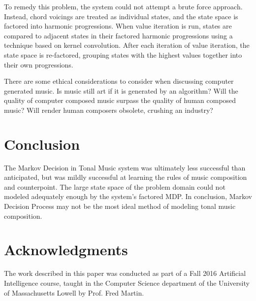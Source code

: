 \documentclass{chi2009}
\begin{document}
To remedy this problem, the system could not attempt a brute force approach.  Instead, chord voicings are treated as individual states, and the state space is factored into harmonic progressions.  When value iteration is run, states are compared to adjacent states in their factored harmonic progressions using a technique based on kernel convolution.  After each iteration of value iteration, the state space is re-factored, grouping states with the highest values together into their own progressions.

There are some ethical considerations to consider when discussing computer generated music.  Is music still art if it is generated by an algorithm?
Will the quality of computer composed music surpass the quality of human composed music?  Will render human composers obsolete, crushing an industry?  



\section{Conclusion}

The Markov Decision in Tonal Music system was ultimately less successful than anticipated, but was mildly successful at learning the rules of music composition and counterpoint.  The large state space of the problem domain could not modeled adequately enough by the system's factored MDP.  In conclusion, Markov Decision Process may not be the most ideal method of modeling tonal music composition.

\section{Acknowledgments}
The work described in this paper was conducted as part of a Fall 2016 Artificial Intelligence course, taught in the Computer Science department of the University of Massachusetts Lowell by Prof. Fred Martin.
\end{document}
